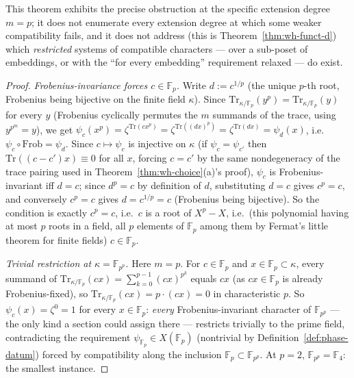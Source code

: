 \begin{scope}
This theorem exhibits the precise obstruction at the specific extension
degree $m=p$; it does not enumerate every extension degree at which some
weaker compatibility fails, and it does not address (this is
Theorem~\ref{thm:wh-funct-d}) which \emph{restricted} systems of compatible
characters — over a sub-poset of embeddings, or with the ``for every
embedding'' requirement relaxed — do exist.
\end{scope}


\begin{proof}
\emph{Frobenius-invariance forces $c\in\mathbb{F}_p$.} Write
$d:=c^{1/p}$ (the unique $p$-th root, Frobenius being bijective on the
finite field $\kappa$). Since
$\mathrm{Tr}_{\kappa/\mathbb{F}_p}(y^p)=\mathrm{Tr}_{\kappa/\mathbb{F}_p}(y)$
for every $y$ (Frobenius cyclically permutes the $m$ summands of the trace,
using $y^{p^m}=y$), we get
$\psi_c(x^p) = \zeta^{\mathrm{Tr}(cx^p)} = \zeta^{\mathrm{Tr}((dx)^p)} = \zeta^{\mathrm{Tr}(dx)} = \psi_d(x)$,
i.e.\ $\psi_c\circ\mathrm{Frob}=\psi_d$. Since $c\mapsto\psi_c$ is injective
on $\kappa$ (if $\psi_c=\psi_{c'}$ then $\mathrm{Tr}((c-c')x)\equiv 0$ for
all $x$, forcing $c=c'$ by the same nondegeneracy of the trace pairing used
in Theorem~\ref{thm:wh-choice}(a)'s proof), $\psi_c$ is Frobenius-invariant
iff $d=c$; since $d^p=c$ by definition of $d$, substituting $d=c$ gives
$c^p=c$, and conversely $c^p=c$ gives $d=c^{1/p}=c$ (Frobenius being
bijective). So the condition is exactly $c^p=c$, i.e.\ $c$ is a root of
$X^p-X$, i.e.\
(this polynomial having at most $p$ roots in a field, all $p$ elements of
$\mathbb{F}_p$ among them by Fermat's little theorem for finite fields)
$c\in\mathbb{F}_p$.

\emph{Trivial restriction at $\kappa=\mathbb{F}_{p^p}$.} Here $m=p$. For
$c\in\mathbb{F}_p$ and $x\in\mathbb{F}_p\subset\kappa$, every summand of
$\mathrm{Tr}_{\kappa/\mathbb{F}_p}(cx)=\sum_{k=0}^{p-1}(cx)^{p^k}$ equals
$cx$ (as $cx\in\mathbb{F}_p$ is already Frobenius-fixed), so
$\mathrm{Tr}_{\kappa/\mathbb{F}_p}(cx)=p\cdot(cx)=0$ in characteristic $p$.
So $\psi_c(x)=\zeta^0=1$ for every $x\in\mathbb{F}_p$: \emph{every}
Frobenius-invariant character of $\mathbb{F}_{p^p}$ — the only kind a
section could assign there — restricts trivially to the prime field,
contradicting the requirement $\psi_{\mathbb{F}_p}\in X(\mathbb{F}_p)$
(nontrivial by Definition~\ref{def:phase-datum}) forced by compatibility
along the inclusion $\mathbb{F}_p\subset\mathbb{F}_{p^p}$. At $p=2$,
$\mathbb{F}_{p^p}=\mathbb{F}_4$: the smallest instance.
\end{proof}

